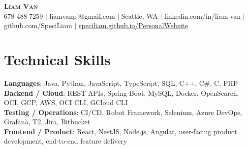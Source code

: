 \documentclass[letterpaper,11pt]{article}
\begin{document}

%
\begin{center}
    \textbf{\Huge \scshape Liam Van} \\ \vspace{1pt}
    \small 678-488-7259 $|$ \small {liamvanpj@gmail.com} $|$ Seattle, WA
 {{$|$ linkedin.com/in/liam-van} {$|$ github.com/SpeciLiam} {$|$ \href{https://speciliam.github.io/PersonalWebsite}{speciliam.github.io/PersonalWebsite}}}

\end{center}

\section{Technical Skills}
 \begin{itemize}[leftmargin=0.15in, label={}]
    \small{\item{
     \textbf{Languages}{: Java, Python, JavaScript, TypeScript, SQL, C++, C\#, C, PHP} \\
     \textbf{Backend / Cloud}{: REST APIs, Spring Boot, MySQL, Docker, OpenSearch, OCI, GCP, AWS, OCI CLI, GCloud CLI} \\
     \textbf{Testing / Operations}{: CI/CD, Robot Framework, Selenium, Azure DevOps, Grafana, T2, Jira, Bitbucket} \\
     \textbf{Frontend / Product}{: React, NestJS, Node.js, Angular, user-facing product development, end-to-end feature delivery} \\
    }}
 \end{itemize}
%
\end{document}
